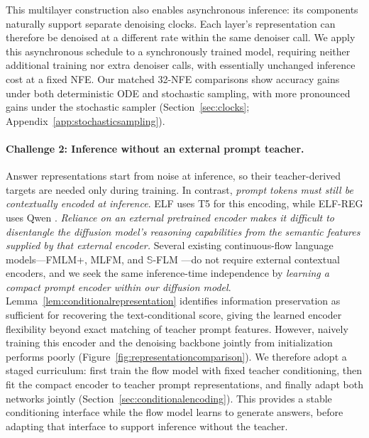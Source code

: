 \documentclass{article}
\newcommand{\rev}[1]{{\color{blue}#1}}
\newcommand{\revp}[1]{\par\color{blue}#1\par\color{black}}
\begin{document}
\revp{This multilayer construction also enables asynchronous inference: its components naturally support separate denoising clocks. Each layer's representation can therefore be denoised at a different rate within the same denoiser call. We apply this asynchronous schedule to a synchronously trained model, requiring neither additional training nor extra denoiser calls, with essentially unchanged inference cost at a fixed NFE. Our matched 32-NFE comparisons show accuracy gains under both deterministic ODE and stochastic sampling, with more pronounced gains under the stochastic sampler (Section~\ref{sec:clocks}; Appendix~\ref{app:stochasticsampling}).}

\paragraph{\rev{Challenge 2: Inference without an external prompt teacher.}}
\rev{Answer representations start from noise at inference, so their teacher-derived targets are needed only during training. In contrast, \emph{prompt tokens must still be contextually encoded at inference}.
ELF uses T5 for this encoding, while ELF-REG uses Qwen \citep{elf,scalingdlm}.
\emph{Reliance on an external pretrained encoder makes it difficult to disentangle the diffusion model's reasoning capabilities from the semantic features supplied by that external encoder.} Several existing continuous-flow language models---FMLM+, MLFM, and $\mathbb S$-FLM \citep{posterior,mlfm,hyperspherical}---do not require external contextual encoders, and we seek the same inference-time independence by \emph{learning a compact prompt encoder within our diffusion model}. Lemma~\ref{lem:conditionalrepresentation} identifies information preservation as sufficient for recovering the text-conditional score, giving the learned encoder flexibility beyond exact matching of teacher prompt features. However, naively training this encoder and the denoising backbone jointly from initialization performs poorly (Figure~\ref{fig:representationcomparison}). We therefore adopt a staged curriculum: first train the flow model with fixed teacher conditioning, then fit the compact encoder to teacher prompt representations, and finally adapt both networks jointly (Section~\ref{sec:conditionalencoding}). This provides a stable conditioning interface while the flow model learns to generate answers, before adapting that interface to support inference without the teacher.}
\end{document}
